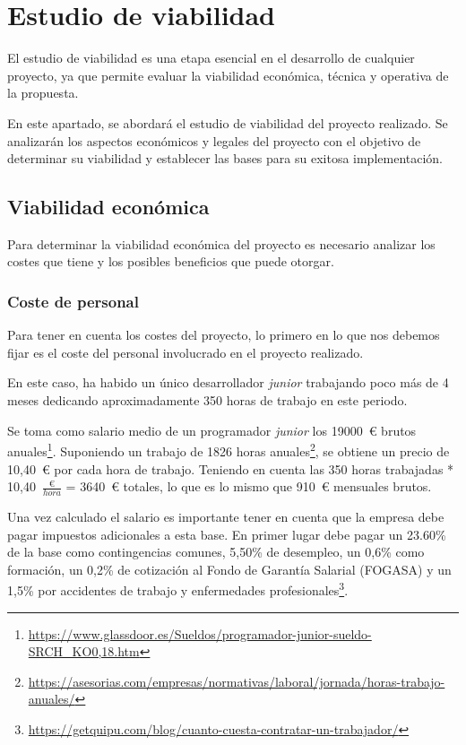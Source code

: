 \section{Estudio de viabilidad}
El estudio de viabilidad es una etapa esencial en el desarrollo de cualquier proyecto, ya que permite evaluar la viabilidad económica, técnica y operativa de la propuesta. 

En este apartado, se abordará el estudio de viabilidad del proyecto realizado.
Se analizarán los aspectos económicos y legales del proyecto con el objetivo de determinar su viabilidad y establecer las bases para su exitosa implementación.

\subsection{Viabilidad económica}
Para determinar la viabilidad económica del proyecto es necesario analizar los costes que tiene y los posibles beneficios que puede otorgar.

\subsubsection{Coste de personal}
Para tener en cuenta los costes del proyecto, lo primero en lo que nos debemos fijar es el coste del personal involucrado en el proyecto realizado.

En este caso, ha habido un único desarrollador \textit{junior} trabajando poco más de 4 meses dedicando aproximadamente 350 horas de trabajo en este periodo.

Se toma como salario medio de un programador \textit{junior} los 19000~€ brutos anuales\footnote{\url{https://www.glassdoor.es/Sueldos/programador-junior-sueldo-SRCH_KO0,18.htm}}.
Suponiendo un trabajo de 1826 horas anuales\footnote{\url{https://asesorias.com/empresas/normativas/laboral/jornada/horas-trabajo-anuales/}}, se obtiene un precio de 10,40~€ por cada hora de trabajo.
Teniendo en cuenta las 350 horas trabajadas * 10,40~$\frac{\text{€}}{hora}$ = 3640~€ totales, lo que es lo mismo que 910~€ mensuales brutos.

Una vez calculado el salario es importante tener en cuenta que la empresa debe pagar impuestos adicionales a esta base.
En primer lugar debe pagar un 23.60\% de la base como contingencias comunes, 5,50\% de desempleo, un 0,6\% como formación, un 0,2\% de cotización al Fondo de Garantía Salarial (FOGASA) y un 1,5\% por accidentes de trabajo y enfermedades profesionales\footnote{\url{https://getquipu.com/blog/cuanto-cuesta-contratar-un-trabajador/}}.

